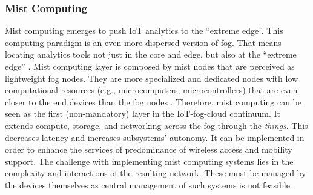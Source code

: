 \subsubsection{Mist Computing}
Mist computing emerges to push IoT analytics to the ``extreme edge''. This computing paradigm is an even more dispersed version of fog. That means locating analytics tools not just in the core and edge, but also at the ``extreme edge'' \cite{Ciscopus95:online}. Mist computing layer is composed by mist nodes that are perceived as lightweight fog nodes. They are more specialized and dedicated nodes with low computational resources (e.g., microcomputers, microcontrollers) that are even closer to the end devices than the fog nodes \cite{iorga2018fog}. Therefore, mist computing can be seen as the first (non-mandatory) layer in the IoT-fog-cloud continuum. It extends compute, storage, and networking across the fog through the \textit{things}. This decreases latency and increases subsystems' autonomy. It can be implemented in order to enhance the services of predominance of wireless access and mobility support. The challenge with implementing mist computing systems lies in the complexity and interactions of the resulting network. These must be managed by the devices themselves as central management of such systems is not feasible.

